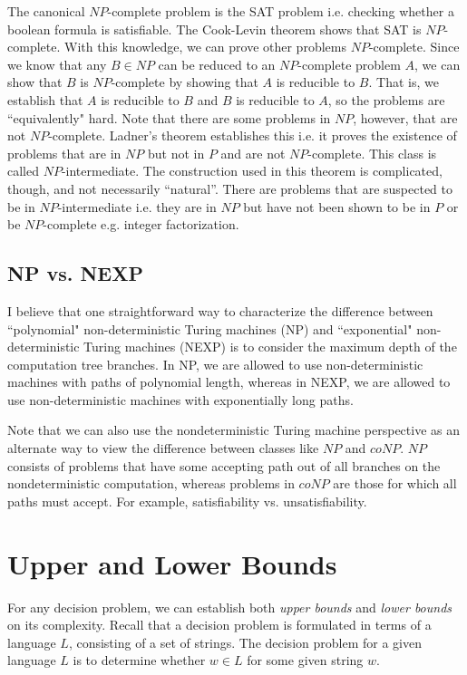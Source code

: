 \documentclass[10pt,a4paper]{article}
\begin{document}
The canonical $NP$-complete problem is the SAT problem i.e. checking whether a boolean formula is satisfiable. The Cook-Levin theorem shows that SAT is $NP$-complete. With this knowledge, we can prove other problems $NP$-complete. Since we know that any $B \in NP$ can be reduced to an $NP$-complete problem $A$, we can show that $B$ is $NP$-complete by showing that $A$ is reducible to $B$. That is, we establish that $A$ is reducible to $B$ and $B$ is reducible to $A$, so the problems are ``equivalently" hard. Note that there are some problems in $NP$, however, that are not $NP$-complete. Ladner's theorem establishes this i.e. it proves the existence of problems that are in $NP$ but not in $P$ and are not $NP$-complete. This class is called $NP$-intermediate. The construction used in this theorem is complicated, though, and not necessarily ``natural''. There are problems that are suspected to be in $NP$-intermediate i.e. they are in $NP$ but have not been shown to be in $P$ or be $NP$-complete e.g. integer factorization.

\subsection{NP vs. NEXP}

I believe that one straightforward way to characterize the difference between ``polynomial" non-deterministic Turing machines (NP) and ``exponential" non-deterministic Turing machines (NEXP) is to consider the maximum depth of the computation tree branches. In NP, we are allowed to use non-deterministic machines with paths of polynomial length, whereas in NEXP, we are allowed to use non-deterministic machines with exponentially long paths.

Note that we can also use the nondeterministic Turing machine perspective as an alternate way to view the difference between classes like $NP$ and $coNP$. $NP$ consists of problems that have some accepting path out of all branches on the nondeterministic computation, whereas problems in $coNP$ are those for which all paths must accept. For example, satisfiability vs. unsatisfiability.


\section{Upper and Lower Bounds}


For any decision problem, we can establish both \textit{upper bounds} and \textit{lower bounds} on its complexity. Recall that a decision problem is formulated in terms of a language $L$, consisting of a set of strings. The decision problem for a given language $L$ is to determine whether $w \in L$ for some given string $w$.
\end{document}
